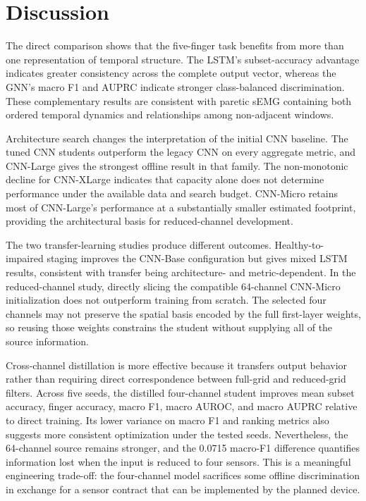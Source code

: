 \section{Discussion}

The direct comparison shows that the five-finger task benefits from more than one representation of temporal structure. The LSTM's subset-accuracy advantage indicates greater consistency across the complete output vector, whereas the GNN's macro F1 and AUPRC indicate stronger class-balanced discrimination. These complementary results are consistent with paretic sEMG containing both ordered temporal dynamics and relationships among non-adjacent windows.

Architecture search changes the interpretation of the initial CNN baseline. The tuned CNN students outperform the legacy CNN on every aggregate metric, and CNN-Large gives the strongest offline result in that family. The non-monotonic decline for CNN-XLarge indicates that capacity alone does not determine performance under the available data and search budget. CNN-Micro retains most of CNN-Large's performance at a substantially smaller estimated footprint, providing the architectural basis for reduced-channel development.

The two transfer-learning studies produce different outcomes. Healthy-to-impaired staging improves the CNN-Base configuration but gives mixed LSTM results, consistent with transfer being architecture- and metric-dependent. In the reduced-channel study, directly slicing the compatible 64-channel CNN-Micro initialization does not outperform training from scratch. The selected four channels may not preserve the spatial basis encoded by the full first-layer weights, so reusing those weights constrains the student without supplying all of the source information.

Cross-channel distillation is more effective because it transfers output behavior rather than requiring direct correspondence between full-grid and reduced-grid filters. Across five seeds, the distilled four-channel student improves mean subset accuracy, finger accuracy, macro F1, macro AUROC, and macro AUPRC relative to direct training. Its lower variance on macro F1 and ranking metrics also suggests more consistent optimization under the tested seeds. Nevertheless, the 64-channel source remains stronger, and the 0.0715 macro-F1 difference quantifies information lost when the input is reduced to four sensors. This is a meaningful engineering trade-off: the four-channel model sacrifices some offline discrimination in exchange for a sensor contract that can be implemented by the planned device.

